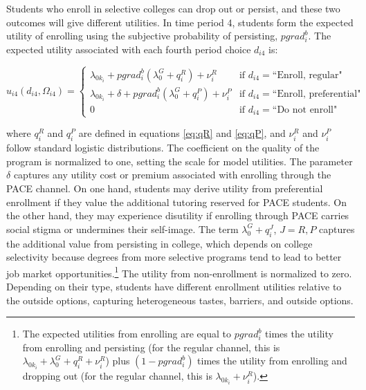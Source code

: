  Students who enroll in selective colleges can drop out or persist, and these two outcomes will give different utilities. In time period 4, students form the expected utility of enrolling using the subjective probability of persisting, $pgrad^b_i$. The expected utility associated with each fourth period choice $d_{i4}$ is:


 \begin{equation}\label{eq:Enrollmentut}
u_{i4}(d_{i4},\Omega_{i4}) = 
\begin{cases}
   \lambda_{0k_i} +pgrad^b_i(\lambda^G_{0}+ q_i^R) + \nu_i^R  & \text{if } d_{i4}=\mbox{``Enroll, regular"}\\
        \lambda_{0k_i}+\delta +pgrad^b_i(\lambda^G_{0}+ q_i^P) + \nu_i^P                                  & \text{if } d_{i4}=\mbox{``Enroll, preferential"}\\
        0  & \text{if } d_{i4}=\mbox{``Do not enroll"}
    \end{cases}
    \end{equation}
 
 

\noindent where $q_i^R$ and $q_i^P$  are defined in equations \eqref{eq:qR} and \eqref{eq:qP}, and $\nu_i^R$ and $\nu_i^P$ follow standard logistic distributions. The coefficient on the quality of the program is normalized to one, setting the scale for model utilities. The parameter $\delta$ captures any utility cost or premium associated with enrolling through the PACE channel. On one hand, students may derive utility from preferential enrollment if they value the additional tutoring reserved for PACE students. On the other hand, they may experience disutility if enrolling through PACE carries social stigma or undermines their self-image. The term $\lambda_0^G+q^J_i$, $J=R,P$ captures the additional value from persisting in college, which depends on college selectivity because degrees from more selective programs tend to lead to better job market opportunities.\footnote{The expected utilities from enrolling are equal to $pgrad^b_i$ times the utility from enrolling and persisting (for the regular channel, this is $\lambda_{0k_i} + \lambda_0^G+q^R_i+\nu^R_i$) plus $(1-pgrad^b_i)$ times the utility from enrolling and dropping out (for the regular channel, this is $\lambda_{0k_i}+\nu^R_i$).} The utility from non-enrollment is normalized to zero. Depending on their type, students have different enrollment utilities relative to the outside options, capturing heterogeneous tastes, barriers, and outside options. 








